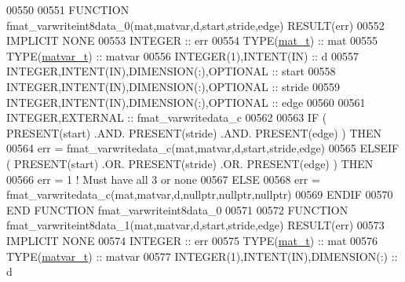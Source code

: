 \begin{DoxyCode}
00550 
00551 \textcolor{keyword}{FUNCTION }fmat\_varwriteint8data\_0(mat,matvar,d,start,stride,edge) \textcolor{keyword}{RESULT}(err)
00552 \textcolor{keywordtype}{IMPLICIT NONE}
00553     \textcolor{keywordtype}{INTEGER}                                  :: err
00554     \textcolor{keywordtype}{TYPE}(\hyperlink{group___m_a_t_gab0fc888f5a5d79943b16284b1f91c2e8}{mat\_t})                              :: mat
00555     \textcolor{keywordtype}{TYPE}(\hyperlink{group___m_a_t_structmatvar__t}{matvar\_t})                           :: matvar
00556     \textcolor{keywordtype}{INTEGER(1)},\textcolor{keywordtype}{INTENT(IN)}                    :: d
00557     \textcolor{keywordtype}{INTEGER},\textcolor{keywordtype}{INTENT(IN)},\textcolor{keywordtype}{DIMENSION(:)},\textcolor{keywordtype}{OPTIONAL} :: start
00558     \textcolor{keywordtype}{INTEGER},\textcolor{keywordtype}{INTENT(IN)},\textcolor{keywordtype}{DIMENSION(:)},\textcolor{keywordtype}{OPTIONAL} :: stride
00559     \textcolor{keywordtype}{INTEGER},\textcolor{keywordtype}{INTENT(IN)},\textcolor{keywordtype}{DIMENSION(:)},\textcolor{keywordtype}{OPTIONAL} :: edge
00560 
00561     \textcolor{keywordtype}{INTEGER},\textcolor{keywordtype}{EXTERNAL}                         :: fmat\_varwritedata\_c
00562 
00563     \textcolor{keywordflow}{IF} ( \textcolor{keyword}{PRESENT}(start) .AND. \textcolor{keyword}{PRESENT}(stride) .AND. \textcolor{keyword}{PRESENT}(edge) ) \textcolor{keywordflow}{THEN}
00564         err = fmat\_varwritedata\_c(mat,matvar,d,start,stride,edge)
00565     \textcolor{keywordflow}{ELSEIF} ( \textcolor{keyword}{PRESENT}(start) .OR. \textcolor{keyword}{PRESENT}(stride) .OR. \textcolor{keyword}{PRESENT}(edge) ) \textcolor{keywordflow}{THEN}
00566         err = 1    \textcolor{comment}{! Must have all 3 or none}
00567     \textcolor{keywordflow}{ELSE}
00568         err = fmat\_varwritedata\_c(mat,matvar,d,nullptr,nullptr,nullptr)
00569 \textcolor{keywordflow}{    ENDIF}
00570 \textcolor{keyword}{END FUNCTION }fmat\_varwriteint8data\_0
00571 
00572 \textcolor{keyword}{FUNCTION }fmat\_varwriteint8data\_1(mat,matvar,d,start,stride,edge) \textcolor{keyword}{RESULT}(err)
00573 \textcolor{keywordtype}{IMPLICIT NONE}
00574     \textcolor{keywordtype}{INTEGER}                                  :: err
00575     \textcolor{keywordtype}{TYPE}(\hyperlink{group___m_a_t_gab0fc888f5a5d79943b16284b1f91c2e8}{mat\_t})                              :: mat
00576     \textcolor{keywordtype}{TYPE}(\hyperlink{group___m_a_t_structmatvar__t}{matvar\_t})                           :: matvar
00577     \textcolor{keywordtype}{INTEGER(1)},\textcolor{keywordtype}{INTENT(IN)},\textcolor{keywordtype}{DIMENSION(:)}       :: d

\end{DoxyCode}
